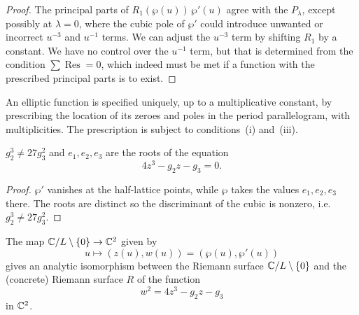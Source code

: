 \documentclass[12pt]{article}
\begin{document}
\begin{proof}
The principal parts of $R_1(\wp(u))\,\wp'(u)$ agree with the $P_\lambda$, except possibly at $\lambda=0$, where the cubic pole of $\wp'$ could introduce unwanted or incorrect $u^{-3}$ and $u^{-1}$ terms. 
We can adjust the $u^{-3}$ term by shifting $R_1$ by a constant. 
We have no control over the $u^{-1}$ term, but that is determined from the condition $\sum \operatorname{Res} = 0$, 
which indeed must be met if a function with the prescribed principal parts is to exist.
\end{proof}

\begin{theorem}
An elliptic function is specified uniquely, up to a multiplicative constant, 
by prescribing the location of its zeroes and poles in the period parallelogram, with multiplicities. 
The prescription is subject to conditions~(i) and~(iii).
\end{theorem}


\begin{lemma}
$g_2^3 \neq 27g_3^2$ and $e_1, e_2, e_3$ are the roots of the equation
\[
4z^3 - g_2 z - g_3 = 0.
\]
\end{lemma}

\begin{proof}
$\wp'$ vanishes at the half-lattice points, while $\wp$ takes the values $e_1,e_2,e_3$ there. The roots are distinct so the discriminant of the cubic is nonzero, i.e.\ $g_2^3 \neq 27g_3^2$.
\end{proof}

\begin{theorem}
The map $\mathbb{C}/L \setminus \{0\} \to \mathbb{C}^2$ given by
\[
u \longmapsto (z(u), w(u)) = (\wp(u), \wp'(u))
\]
gives an analytic isomorphism between the Riemann surface $\mathbb{C}/L \setminus \{0\}$ and the (concrete) Riemann surface $R$ of the function
\[
w^2 = 4z^3 - g_2 z - g_3
\]
in $\mathbb{C}^2$.
\end{theorem}
\end{document}

